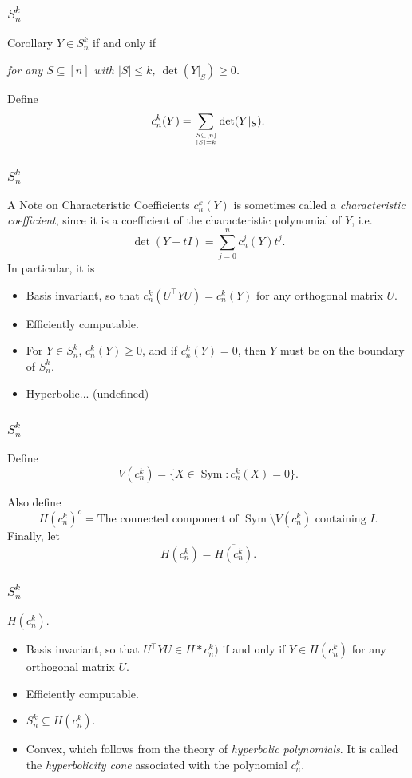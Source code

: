 \documentclass{beamer}
\DeclareMathOperator{\Sym}{Sym}
\renewcommand\top[2]{\genfrac{}{}{0pt}{}{#1}{#2}}
\begin{document}
\begin{frame}
    \frametitle{$S^k_n$}
    \begin{block}{Corollary}
        $Y \in S^k_n$ if and only if

        \hspace{0.25in} \emph{for any $S \subseteq [n]$ with $|S| \le k$, $\det(Y|_S) \ge 0$.}
    \end{block}
    \pause 
    Define 
    \[
        c_n^k(Y) = \sum_{\top{S \subseteq [n]}{|S| = k}}  \det(Y|_S).
    \]
\end{frame}
\begin{frame}
    \frametitle{$S^k_n$}
    \begin{block}{A Note on Characteristic Coefficients}
        $c_n^k(Y)$ is sometimes called a \emph{characteristic coefficient}, since it is a coefficient of the characteristic polynomial of $Y$, i.e.
        \[
            \det(Y + tI) = \sum_{j=0}^n c_n^j(Y) t^j.
        \]
        \pause
        In particular, it is
        \begin{itemize}
            \item Basis invariant, so that $c_n^k(U^{\intercal} Y U) = c_n^k(Y)$ for any orthogonal matrix $U$.
            \pause
            \item Efficiently computable.
            \pause
            \item For $Y \in S^k_n$, $c_n^k(Y) \ge 0$, and if $c_n^k(Y) = 0$, then $Y$ must be on the boundary of $S^k_n$.
            \pause
            \item Hyperbolic... (undefined)
        \end{itemize}
    \end{block}
\end{frame}
\begin{frame}
    \frametitle{$S^k_n$}
    Define
    \[
        V(c^k_n) = \{ X \in \Sym : c_n^k(X) = 0\}.
    \]

    Also define
    \[
        H(c^k_n)^o = \text{The connected component of }\Sym\setminus V(c^k_n) \text{ containing }I.
    \]
    Finally, let 
    \[
        H(c^k_n) = \overline{H(c^k_n)}.
    \]
\end{frame}
\begin{frame}
    \frametitle{$S^k_n$}
    $H(c^k_n)$.
    \begin{itemize}
        \item Basis invariant, so that $U^{\intercal} Y U \in H*c^k_n)$ if and only if $Y \in H(c^k_n)$ for any orthogonal matrix $U$.
        \pause
        \item Efficiently computable.
        \pause
        \item $S^k_n \subseteq H(c^k_n).$
        \pause
        \item Convex, which follows from the theory of \emph{hyperbolic polynomials}. It is called the \emph{hyperbolicity cone} associated with the polynomial $c_n^k$.
    \end{itemize}
\end{frame}
\end{document}
